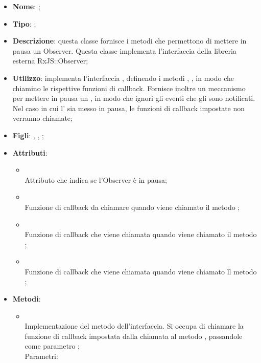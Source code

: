 \begin{itemize}
	\item \textbf{Nome}: ;
	\item \textbf{Tipo}: ;
	\item \textbf{Descrizione}: questa classe fornisce i metodi che permettono di mettere in pausa un Observer.
Questa classe implementa l'interfaccia della libreria esterna RxJS::Observer;
	\item \textbf{Utilizzo}: implementa l'interfaccia , definendo i metodi , ,  in modo che chiamino le rispettive funzioni di callback. Fornisce inoltre un meccanismo per mettere in pausa un , in modo che ignori gli eventi che gli sono notificati. Nel caso in cui l' sia messo in pausa, le funzioni di callback impostate non verranno chiamate;
	\item \textbf{Figli}: , , ;
	\item \textbf{Attributi}:
	\begin{itemize}
		\item[]  \\
		Attributo che indica se l'Observer è in pausa;
		\item[]  \\
		Funzione di callback da chiamare quando viene chiamato il metodo ;
		\item[]  \\
		Funzione di callback che viene chiamata quando viene chiamato il metodo ;
		\item[]  \\
		Funzione di callback che viene chiamata quando viene chiamato ll metodo ;
	\end{itemize}
	\item \textbf{Metodi}:
	\begin{itemize}
		\item[]  \\
		Implementazione del metodo dell'interfaccia. Si occupa di chiamare la funzione di callback impostata dalla chiamata al metodo , passandole come parametro ;\\
		Parametri:
		\begin{itemize}

\end{itemize}
\end{itemize}
\end{itemize}
